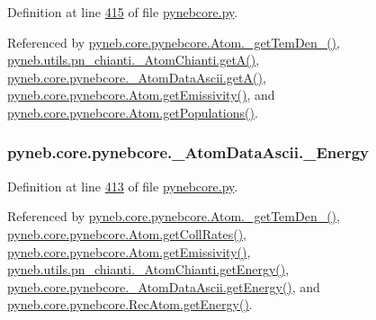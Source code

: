 Definition at line \hyperlink{pynebcore_8py_source_l00415}{415} of file \hyperlink{pynebcore_8py_source}{pynebcore.\-py}.



Referenced by \hyperlink{pynebcore_8py_source_l01869}{pyneb.\-core.\-pynebcore.\-Atom.\-\_\-get\-Tem\-Den\-\_()}, \hyperlink{pn__chianti_8py_source_l00316}{pyneb.\-utils.\-pn\-\_\-chianti.\-\_\-\-Atom\-Chianti.\-get\-A()}, \hyperlink{pynebcore_8py_source_l00487}{pyneb.\-core.\-pynebcore.\-\_\-\-Atom\-Data\-Ascii.\-get\-A()}, \hyperlink{pynebcore_8py_source_l01782}{pyneb.\-core.\-pynebcore.\-Atom.\-get\-Emissivity()}, and \hyperlink{pynebcore_8py_source_l01562}{pyneb.\-core.\-pynebcore.\-Atom.\-get\-Populations()}.

\hypertarget{classpyneb_1_1core_1_1pynebcore_1_1___atom_data_ascii_af9153c0218e68a785d82510cb2ee6248}{
\subsubsection[{\-\_\-\-Energy}]{\setlength{\rightskip}{0pt plus 5cm}pyneb.\-core.\-pynebcore.\-\_\-\-Atom\-Data\-Ascii.\-\_\-\-Energy\hspace{0.3cm}{\ttfamily [private]}}}\label{classpyneb_1_1core_1_1pynebcore_1_1___atom_data_ascii_af9153c0218e68a785d82510cb2ee6248}


Definition at line \hyperlink{pynebcore_8py_source_l00413}{413} of file \hyperlink{pynebcore_8py_source}{pynebcore.\-py}.



Referenced by \hyperlink{pynebcore_8py_source_l01869}{pyneb.\-core.\-pynebcore.\-Atom.\-\_\-get\-Tem\-Den\-\_()}, \hyperlink{pynebcore_8py_source_l01394}{pyneb.\-core.\-pynebcore.\-Atom.\-get\-Coll\-Rates()}, \hyperlink{pynebcore_8py_source_l01782}{pyneb.\-core.\-pynebcore.\-Atom.\-get\-Emissivity()}, \hyperlink{pn__chianti_8py_source_l00366}{pyneb.\-utils.\-pn\-\_\-chianti.\-\_\-\-Atom\-Chianti.\-get\-Energy()}, \hyperlink{pynebcore_8py_source_l00537}{pyneb.\-core.\-pynebcore.\-\_\-\-Atom\-Data\-Ascii.\-get\-Energy()}, and \hyperlink{pynebcore_8py_source_l02927}{pyneb.\-core.\-pynebcore.\-Rec\-Atom.\-get\-Energy()}.

